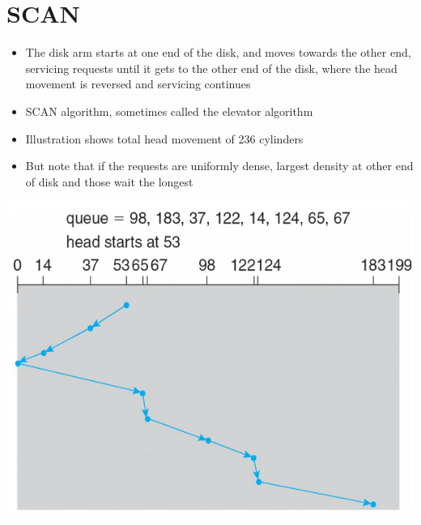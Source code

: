 \documentclass{article}[18pt]
\begin{document}
\section{SCAN}
\begin{itemize}
	\item The disk arm starts at one end of the disk, and moves towards the other end, servicing requests until it gets to the other end of the disk, where the head movement is reversed and servicing continues
	\item SCAN algorithm, sometimes called the elevator algorithm
	\item Illustration shows total head movement of 236 cylinders
	\item But note that if the requests are uniformly dense, largest density at other end of disk and those wait the longest
\end{itemize}
\begin{center}
	\includegraphics[scale=0.7]{SCAN}
\end{center}
\end{document}
